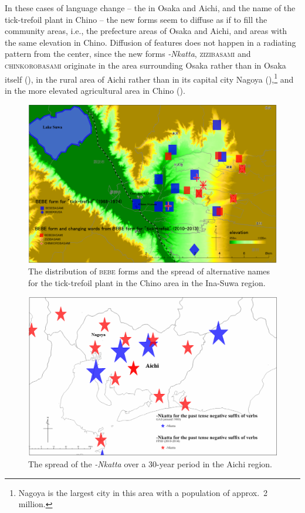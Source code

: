 \documentclass[output=paper]{LSP/langsci}
\begin{document}
In these cases of language change -- the  in Osaka and Aichi, and the name of the tick-trefoil plant in Chino -- the new forms seem to diffuse as if to fill the community areas, i.e., the prefecture areas of Osaka and Aichi, and areas with the same elevation in Chino. Diffusion of features does not happen in a radiating pattern from the center, since the new forms \textit{-Nkatta}, \textsc{zizibasami} and \textsc{chinkorobasami} originate in the area surrounding Osaka rather than in Osaka itself (), in the rural area of Aichi rather than in its capital city Nagoya (),\footnote{ Nagoya is the largest city in this area with a population of approx.\ 2 million.} and in the more elevated agricultural area in Chino ().


\begin{figure}
\includegraphics[width=\textwidth]{illustrations/onishi_fig5}
\caption{The distribution of \textsc{bebe} forms and the spread of alternative names for the tick-trefoil plant in the Chino area in the Ina-Suwa region.}
\label{fig:5}
\end{figure}

\begin{figure}
\includegraphics[width=\textwidth]{illustrations/onishi_fig6}
\caption{The spread of the  \textit{-Nkatta} over a 30-year period in the Aichi region.}
\label{fig:6}
\end{figure}
\end{document}
